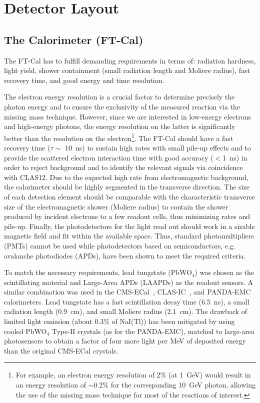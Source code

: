 \section{Detector Layout}

\subsection{The Calorimeter (FT-Cal)}

The FT-Cal has to fulfill demanding requirements in terms of: radiation hardness, light yield, shower containment
(small radiation length and Moliere radius), fast recovery time, and good energy and time resolution.

The electron energy resolution is a crucial factor to determine precisely the photon energy and to ensure the
exclusivity of the measured reaction via the missing mass technique. However, since we are interested in low-energy
electrons and high-energy photons, the energy resolution on the latter is significantly better than the resolution on
the electron\footnote {For example, an electron energy resolution of 2\% (at 1~GeV) would result in an energy
  resolution of $\sim$0.2\% for the corresponding 10~GeV photon, allowing the use of the missing mass technique
  for most of the reactions of interest.}. The FT-Cal should have a fast recovery time ($\tau\sim$ 10~ns) to sustain
high rates with small pile-up effects and to provide the scattered electron interaction time with good accuracy
($<$1~ns) in order to reject background and to identify the relevant signals via coincidence with CLAS12. Due to the
expected high rate from electromagnetic background, the calorimeter should be highly segmented in the transverse
direction. The size of each detection element should be comparable with the characteristic transverse size of the
electromagnetic shower (Moliere radius) to contain the shower produced by incident electrons to a few readout cells,
thus minimizing rates and pile-up. Finally, the photodetectors for the light read out should work  in a sizable magnetic
field and fit within the available space. Thus, standard photomultipliers (PMTs) cannot be used while photodetectors
based on semiconductors, e.g. avalanche photodiodes (APDs), have been shown to meet the required criteria. 

To match the necessary requirements, lead tungstate (PbWO$_4$) was chosen as the scintillating material and
Large-Area APDs (LAAPDs) as the readout sensors. A similar  combination was used in the CMS-ECal~\cite{CMS-ECal},
CLAS-IC~\cite{CLAS-IC}, and PANDA-EMC~\cite{PANDA-ECal} calorimeters. Lead tungstate has a fast scintillation
decay time (6.5~ns), a small radiation length (0.9~cm), and small Moliere radius (2.1~cm). The drawback of limited
light emission (about 0.3\% of NaI(Tl)) has been mitigated by using cooled PbWO$_4$ Type-II crystals (as for the
PANDA-EMC), matched to large-area photosensors to obtain a factor of four more light per MeV of deposited energy
than the original CMS-ECal crystals.

